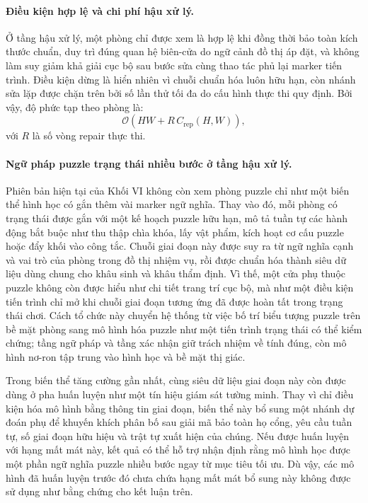 \documentclass[oneside,a4paper,12pt]{extreport}
\begin{document}
\paragraph{Điều kiện hợp lệ và chi phí hậu xử lý.}
Ở tầng hậu xử lý, một phòng chỉ được xem là hợp lệ khi đồng thời bảo toàn kích thước chuẩn, duy trì đúng quan hệ biên-cửa do ngữ cảnh đồ thị áp đặt, và không làm suy giảm khả giải cục bộ sau bước sửa cùng thao tác phủ lại marker tiến trình. Điều kiện dừng là hiển nhiên vì chuỗi chuẩn hóa luôn hữu hạn, còn nhánh sửa lặp được chặn trên bởi số lần thử tối đa do cấu hình thực thi quy định. Bởi vậy, độ phức tạp theo phòng là:
\begin{equation}
\mathcal{O}\!\left(HW + R\,C_{\text{rep}}(H,W)\right),
\end{equation}
với $R$ là số vòng repair thực thi.

\paragraph{Ngữ pháp puzzle trạng thái nhiều bước ở tầng hậu xử lý.}
Phiên bản hiện tại của Khối VI không còn xem phòng puzzle chỉ như một biến thể
hình học có gắn thêm vài marker ngữ nghĩa. Thay vào đó, mỗi phòng có trạng thái
được gắn với một kế hoạch puzzle hữu hạn, mô tả tuần tự các hành động bắt buộc
như thu thập chìa khóa, lấy vật phẩm, kích hoạt cơ cấu puzzle hoặc đẩy khối vào
công tắc. Chuỗi giai đoạn này được suy ra từ ngữ nghĩa cạnh và vai trò của
phòng trong đồ thị nhiệm vụ, rồi được chuẩn hóa thành siêu dữ liệu dùng chung cho
khâu sinh và khâu thẩm định. Vì thế, một cửa phụ thuộc puzzle không còn được
hiểu như chi tiết trang trí cục bộ, mà như một điều kiện tiến trình chỉ mở khi
chuỗi giai đoạn tương ứng đã được hoàn tất trong trạng thái chơi. Cách tổ chức
này chuyển hệ thống từ việc bố trí biểu tượng puzzle trên bề mặt phòng sang mô
hình hóa puzzle như một tiến trình trạng thái có thể kiểm chứng; tầng ngữ pháp
và tầng xác nhận giữ trách nhiệm về tính đúng, còn mô hình nơ-ron tập trung vào
hình học và bề mặt thị giác.

Trong biến thể tăng cường gần nhất, cùng siêu dữ liệu giai đoạn này còn được dùng ở
pha huấn luyện như một tín hiệu giám sát tường minh. Thay vì chỉ điều kiện hóa
mô hình bằng thông tin giai đoạn, biến thể này bổ sung một nhánh dự đoán phụ để
khuyến khích phân bố sau giải mã bảo toàn họ cổng, yêu cầu tuần tự, số giai đoạn
hữu hiệu và trật tự xuất hiện của chúng. Nếu được huấn luyện với hạng mất mát này,
kết quả có thể hỗ trợ nhận định rằng mô hình học được một phần ngữ nghĩa puzzle
nhiều bước ngay từ mục tiêu tối ưu. Dù vậy, các mô hình đã huấn luyện trước đó
chưa chứa hạng mất mát bổ sung này không được sử dụng như bằng chứng cho kết
luận trên.
\end{document}
